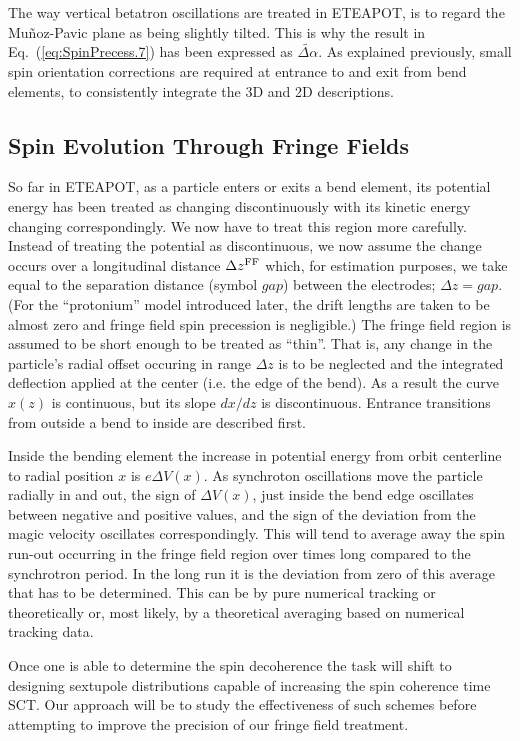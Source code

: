 \documentclass[]{article}
\begin{document}
The way vertical betatron oscillations are treated
in ETEAPOT, is to regard the Mu\~noz-Pavic plane
as being slightly tilted. This is why the result
in Eq.~(\ref{eq:SpinPrecess.7}) has been expressed
as $\widetilde{\Delta\alpha}$. As explained previously,
small spin orientation corrections are required
at entrance to and exit from bend elements, to consistently
integrate the 3D and 2D descriptions. 

\subsection{Spin Evolution Through Fringe Fields}
So far in ETEAPOT, as a particle enters or exits a bend element, 
its potential
energy has been treated as changing discontinuously with 
its kinetic energy changing correspondingly. We now have
to treat this region more carefully. Instead of treating
the potential as discontinuous, we now assume the change 
occurs over a longitudinal distance $\Delta z^{\rm FF}$ which, for 
estimation purposes, we take equal to the separation 
distance (symbol $gap$) between the electrodes; $\Delta z=gap$. 
(For the ``protonium'' model introduced later, the drift lengths
are taken to be almost zero and fringe field spin precession
is negligible.)
The fringe field region is assumed to be short enough to
be treated as ``thin''. That is, 
any change in the particle's radial offset
occuring in range $\Delta z$ is to be neglected and the
integrated deflection applied at the center (i.e. the
edge of the bend). As a result 
the curve $x(z)$ is continuous, but its slope $dx/dz$ is 
discontinuous. Entrance transitions 
from outside a bend to inside are described first.

Inside the bending element
the increase in potential energy from orbit
centerline to radial position $x$ is $e\Delta V(x)$. 
As synchroton oscillations move the particle radially in
and out, the sign of $\Delta V(x)$, just inside the
bend edge oscillates between negative and positive values, 
and the sign of the deviation from the magic velocity 
oscillates correspondingly. This will tend to
average away the spin run-out occurring in the fringe field
region over times long compared to
the synchrotron period. In the long run it is the deviation 
from zero of this average that has to be determined. This can be
by pure numerical tracking or theoretically or, 
most likely, by a theoretical averaging based on numerical
tracking data.

Once one is able to determine the spin decoherence the task will
shift to designing sextupole distributions capable of increasing
the spin coherence time SCT. Our approach will be to study
the effectiveness of such schemes before attempting to improve
the precision of our fringe field treatment.
\end{document}
